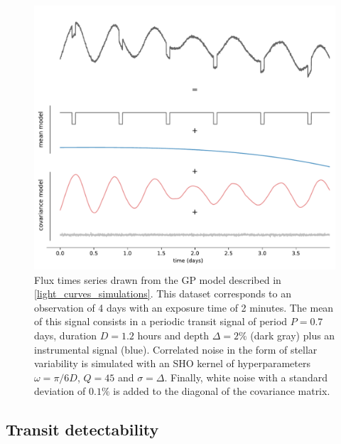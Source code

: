 \documentclass[modern]{aastex631}
\begin{document}
\begin{figure}[H]
    \begin{centering}
        \includegraphics[width=\linewidth]{../workflows/principle/figures/principle_dataset_decomposed.pdf}
        \caption{Flux times series drawn from the GP model described in \autoref{light_curves_simulations}. This dataset corresponds to an observation of 4 days with an exposure time of 2 minutes. The mean of this signal consists in a periodic transit signal of period $P=0.7$ days, duration $D=1.2$ hours and depth $\Delta=2\%$ (dark gray) plus an instrumental signal (blue). Correlated noise in the form of stellar variability is simulated with an SHO kernel of hyperparameters $\omega = \pi / 6 D$, $Q=45$ and $\sigma = \Delta$. Finally, white noise with a standard deviation of $0.1\%$ is added to the diagonal of the covariance matrix.}
        \label{fig:app_principle_dataset}
    \end{centering}
\end{figure}


\subsection{Transit detectability}\label{transit_detectability}
\end{document}

